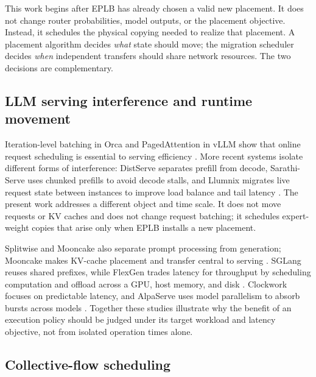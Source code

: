 This work begins after EPLB has already chosen a valid new placement. It does
not change router probabilities, model outputs, or the placement objective.
Instead, it schedules the physical copying needed to realize that placement.
A placement algorithm decides \emph{what} state should move; the migration
scheduler decides \emph{when} independent transfers should share network
resources. The two decisions are complementary.

\subsection{LLM serving interference and runtime movement}

Iteration-level batching in Orca and PagedAttention in vLLM show that online
request scheduling is essential to serving efficiency
\cite{yu2022orca,kwon2023vllm}. More recent systems isolate different forms of
interference: DistServe separates prefill from decode, Sarathi-Serve uses
chunked prefills to avoid decode stalls, and Llumnix migrates live request state
between instances to improve load balance and tail latency
\cite{zhong2024distserve,agrawal2024sarathi,sun2024llumnix}. The present work
addresses a different object and time scale. It does not move requests or KV
caches and does not change request batching; it schedules expert-weight copies
that arise only when EPLB installs a new placement.

Splitwise and Mooncake also separate prompt processing from generation;
Mooncake makes KV-cache placement and transfer central to serving
\cite{patel2023splitwise,qin2024mooncake}. SGLang reuses shared prefixes,
while FlexGen trades latency for throughput by scheduling computation and
offload across a GPU, host memory, and disk
\cite{zheng2023sglang,sheng2023flexgen}. Clockwork focuses on predictable
latency, and AlpaServe uses model parallelism to absorb bursts across models
\cite{gujarati2020clockwork,li2023alpaserve}. Together these studies illustrate
why the benefit of an execution policy should be judged under its target
workload and latency objective, not from isolated operation times alone.

\subsection{Collective-flow scheduling}

